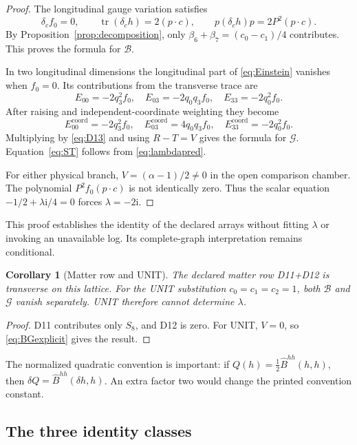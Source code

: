 \documentclass[11pt,a4paper]{article}
\newcommand{\ii}{\mathrm i}
\theoremstyle{plain}
\newtheorem{corollary}[theorem]{Corollary}
\theoremstyle{definition}
\theoremstyle{remark}
\numberwithin{equation}{section}
\begin{document}
\begin{proof}
The longitudinal gauge variation satisfies
\[
 \delta_cf_0=0,\qquad
 \operatorname{tr}(\delta_ch)=2(p\cdot c),
 \qquad
 p(\delta_ch)p=2P^2(p\cdot c).
\]
By Proposition~\ref{prop:decomposition}, only
\(\beta_6+\beta_7=(c_0-c_1)/4\) contributes.
This proves the formula for \(\mathcal B\).

In two longitudinal dimensions the longitudinal part of
\eqref{eq:Einstein} vanishes when \(f_0=0\).
Its contributions from the transverse trace are
\[
 E_{00}=-2q_3^2f_0,\quad
 E_{03}=-2q_0q_3f_0,\quad
 E_{33}=-2q_0^2f_0.
\]
After raising and independent-coordinate weighting they become
\[
 E^{\mathrm{coord}}_{00}=-2q_3^2f_0,\quad
 E^{\mathrm{coord}}_{03}=4q_0q_3f_0,\quad
 E^{\mathrm{coord}}_{33}=-2q_0^2f_0.
\]
Multiplying by \eqref{eq:D13} and using \(R-T=V\) gives the
formula for \(\mathcal G\).
Equation~\eqref{eq:ST} follows from \eqref{eq:lambdapred}.

For either physical branch,
\(V=(\alpha-1)/2\ne0\) in the open comparison chamber.
The polynomial \(P^2f_0(p\cdot c)\) is not identically zero.
Thus the scalar equation
\(-1/2+\lambda\ii/4=0\) forces \(\lambda=-2\ii\).
\end{proof}

This proof establishes the identity of the declared arrays
without fitting \(\lambda\) or invoking an unavailable log.
Its complete-graph interpretation remains conditional.

\begin{corollary}[Matter row and UNIT]
The declared matter row D11+D12 is transverse on this lattice.
For the UNIT substitution \(c_0=c_1=c_2=1\),
both \(\mathcal B\) and \(\mathcal G\) vanish separately.
UNIT therefore cannot determine \(\lambda\).
\end{corollary}

\begin{proof}
D11 contributes only \(S_8\), and D12 is zero.
For UNIT, \(V=0\), so \eqref{eq:BGexplicit} gives the result.
\end{proof}

The normalized quadratic convention is important:
if \(Q(h)=\tfrac12\widehat B^{hh}(h,h)\), then
\(\delta Q=\widehat B^{hh}(\delta h,h)\).
An extra factor two would change the printed convention constant.

\subsection{The three identity classes}
\end{document}
